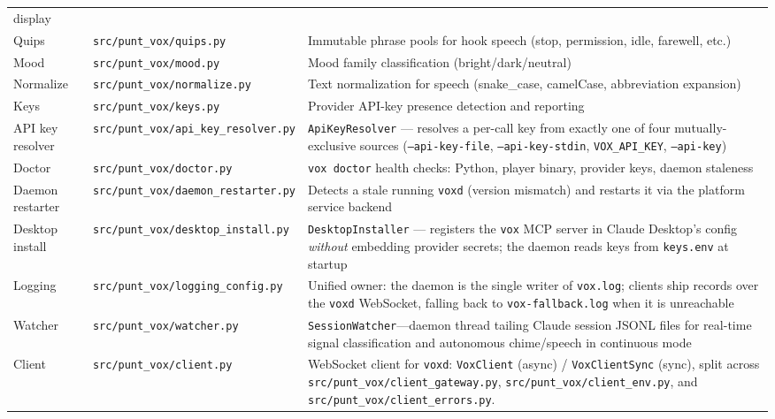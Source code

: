 \documentclass[a4paper,10pt]{article}
\newcommand{\modpath}[1]{\texttt{src/punt\_vox/#1}}
\begin{document}
\begin{center}
\begin{longtable}{llp{6.2cm}}
             display \\
Quips      & \modpath{quips.py}      & Immutable phrase pools for hook
             speech (stop, permission, idle, farewell, etc.) \\
Mood       & \modpath{mood.py}       & Mood family classification
             (bright/dark/neutral) \\
Normalize  & \modpath{normalize.py}  & Text normalization for speech
             (snake\_case, camelCase, abbreviation expansion) \\
Keys       & \modpath{keys.py}       & Provider API-key presence detection
             and reporting \\
API key resolver & \modpath{api\_key\_resolver.py} & \texttt{ApiKeyResolver}
             --- resolves a per-call key from exactly one of four
             mutually-exclusive sources (\texttt{--api-key-file},
             \texttt{--api-key-stdin}, \texttt{VOX\_API\_KEY},
             \texttt{--api-key}) \\
Doctor     & \modpath{doctor.py}     & \texttt{vox doctor} health checks:
             Python, player binary, provider keys, daemon staleness \\
Daemon restarter & \modpath{daemon\_restarter.py} & Detects a stale
             running \texttt{voxd} (version mismatch) and restarts it via
             the platform service backend \\
Desktop install & \modpath{desktop\_install.py} & \texttt{DesktopInstaller}
             --- registers the \texttt{vox} MCP server in Claude Desktop's
             config \emph{without} embedding provider secrets; the daemon
             reads keys from \texttt{keys.env} at startup \\
Logging    & \modpath{logging\_config.py} & Unified owner: the daemon is the
             single writer of \texttt{vox.log}; clients ship records over the
             \texttt{voxd} WebSocket, falling back to \texttt{vox-fallback.log}
             when it is unreachable \\
Watcher    & \modpath{watcher.py}    & \texttt{SessionWatcher}---daemon thread
             tailing Claude session JSONL files for real-time
             signal classification and autonomous chime/speech
             in continuous mode \\
Client     & \modpath{client.py}     & WebSocket client for \texttt{voxd}:
             \texttt{VoxClient} (async) / \texttt{VoxClientSync} (sync),
             split across \modpath{client\_gateway.py},
             \modpath{client\_env.py}, and \modpath{client\_errors.py}.

\end{longtable}
\end{center}
\end{document}

